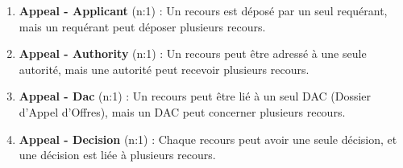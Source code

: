 \begin{enumerate}
    \item \textbf{Appeal - Applicant} (n:1) : Un recours est déposé par un seul requérant, mais un requérant peut déposer plusieurs recours.
    
    \item \textbf{Appeal - Authority} (n:1) : Un recours peut être adressé à une seule autorité, mais une autorité peut recevoir plusieurs recours.
    
    \item \textbf{Appeal - Dac} (n:1) : Un recours peut être lié à un seul DAC (Dossier d'Appel d'Offres), mais un DAC peut concerner plusieurs recours.
    
    \item \textbf{Appeal - Decision} (n:1) : Chaque recours peut avoir une seule décision, et une décision est liée à plusieurs recours.
    
   
\end{enumerate}
